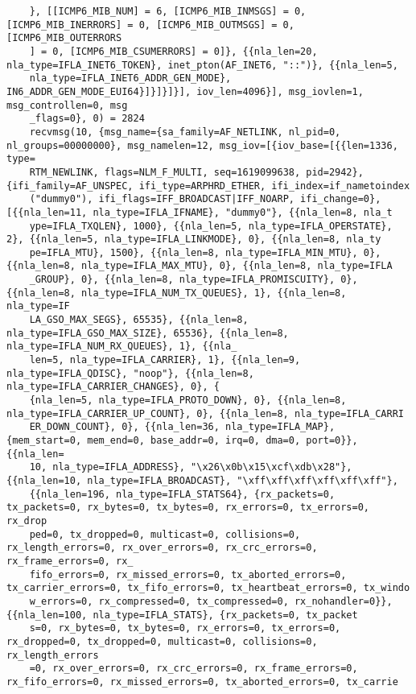 \documentclass[pdf, unicode, 12pt, a4paper,oneside,fleqn]{article}
\begin{document}
{\begin{verbatim}
    }, [[ICMP6_MIB_NUM] = 6, [ICMP6_MIB_INMSGS] = 0, [ICMP6_MIB_INERRORS] = 0, [ICMP6_MIB_OUTMSGS] = 0, [ICMP6_MIB_OUTERRORS
    ] = 0, [ICMP6_MIB_CSUMERRORS] = 0]}, {{nla_len=20, nla_type=IFLA_INET6_TOKEN}, inet_pton(AF_INET6, "::")}, {{nla_len=5, 
    nla_type=IFLA_INET6_ADDR_GEN_MODE}, IN6_ADDR_GEN_MODE_EUI64}]}]}]}], iov_len=4096}], msg_iovlen=1, msg_controllen=0, msg
    _flags=0}, 0) = 2824
    recvmsg(10, {msg_name={sa_family=AF_NETLINK, nl_pid=0, nl_groups=00000000}, msg_namelen=12, msg_iov=[{iov_base=[{{len=1336, type=
    RTM_NEWLINK, flags=NLM_F_MULTI, seq=1619099638, pid=2942}, {ifi_family=AF_UNSPEC, ifi_type=ARPHRD_ETHER, ifi_index=if_nametoindex
    ("dummy0"), ifi_flags=IFF_BROADCAST|IFF_NOARP, ifi_change=0}, [{{nla_len=11, nla_type=IFLA_IFNAME}, "dummy0"}, {{nla_len=8, nla_t
    ype=IFLA_TXQLEN}, 1000}, {{nla_len=5, nla_type=IFLA_OPERSTATE}, 2}, {{nla_len=5, nla_type=IFLA_LINKMODE}, 0}, {{nla_len=8, nla_ty
    pe=IFLA_MTU}, 1500}, {{nla_len=8, nla_type=IFLA_MIN_MTU}, 0}, {{nla_len=8, nla_type=IFLA_MAX_MTU}, 0}, {{nla_len=8, nla_type=IFLA
    _GROUP}, 0}, {{nla_len=8, nla_type=IFLA_PROMISCUITY}, 0}, {{nla_len=8, nla_type=IFLA_NUM_TX_QUEUES}, 1}, {{nla_len=8, nla_type=IF
    LA_GSO_MAX_SEGS}, 65535}, {{nla_len=8, nla_type=IFLA_GSO_MAX_SIZE}, 65536}, {{nla_len=8, nla_type=IFLA_NUM_RX_QUEUES}, 1}, {{nla_
    len=5, nla_type=IFLA_CARRIER}, 1}, {{nla_len=9, nla_type=IFLA_QDISC}, "noop"}, {{nla_len=8, nla_type=IFLA_CARRIER_CHANGES}, 0}, {
    {nla_len=5, nla_type=IFLA_PROTO_DOWN}, 0}, {{nla_len=8, nla_type=IFLA_CARRIER_UP_COUNT}, 0}, {{nla_len=8, nla_type=IFLA_CARRI
    ER_DOWN_COUNT}, 0}, {{nla_len=36, nla_type=IFLA_MAP}, {mem_start=0, mem_end=0, base_addr=0, irq=0, dma=0, port=0}}, {{nla_len=
    10, nla_type=IFLA_ADDRESS}, "\x26\x0b\x15\xcf\xdb\x28"}, {{nla_len=10, nla_type=IFLA_BROADCAST}, "\xff\xff\xff\xff\xff\xff"}, 
    {{nla_len=196, nla_type=IFLA_STATS64}, {rx_packets=0, tx_packets=0, rx_bytes=0, tx_bytes=0, rx_errors=0, tx_errors=0, rx_drop
    ped=0, tx_dropped=0, multicast=0, collisions=0, rx_length_errors=0, rx_over_errors=0, rx_crc_errors=0, rx_frame_errors=0, rx_
    fifo_errors=0, rx_missed_errors=0, tx_aborted_errors=0, tx_carrier_errors=0, tx_fifo_errors=0, tx_heartbeat_errors=0, tx_windo
    w_errors=0, rx_compressed=0, tx_compressed=0, rx_nohandler=0}}, {{nla_len=100, nla_type=IFLA_STATS}, {rx_packets=0, tx_packet
    s=0, rx_bytes=0, tx_bytes=0, rx_errors=0, tx_errors=0, rx_dropped=0, tx_dropped=0, multicast=0, collisions=0, rx_length_errors
    =0, rx_over_errors=0, rx_crc_errors=0, rx_frame_errors=0, rx_fifo_errors=0, rx_missed_errors=0, tx_aborted_errors=0, tx_carrie

\end{verbatim}}
\end{document}

